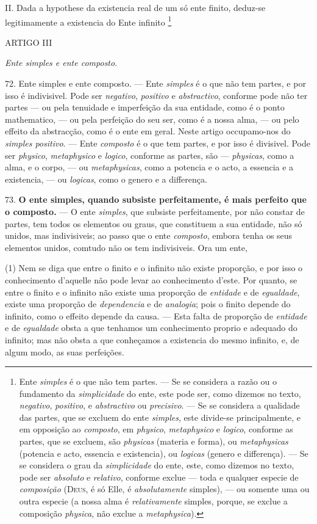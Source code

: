  II. Dada a hypothese da existencia real de um só ente finito, deduz-se legitimamente a existencia do Ente infinito \footnote{Ente \emph{simples} é o que não tem partes. --- Se se considera a razão ou o fundamento da \emph{simplicidade} do ente, este pode ser, como dizemos no texto, \emph{negativo}, \emph{positivo}, e \emph{abstractivo} ou \emph{precisivo}. --- Se se considera a qualidade das partes, que se excluem do ente \emph{simples}, este divide-se principalmente, e em opposição ao \emph{composto}, em \emph{physico}, \emph{metaphysico} e \emph{logico}, conforme as partes, que se excluem, são \emph{physicas} (materia e forma), ou \emph{metaphysicas} (potencia e acto, essencia e existencia), ou \emph{logicas} (genero e differença). --- Se se considera o grau da \emph{simplicidade} do ente, este, como dizemos no texto, pode ser \emph{absoluto} e \emph{relativo}, conforme exclue --- toda e qualquer especie de \emph{composição} (\textsc{Deus}, é só Elle, é \emph{absolutamente} simples), --- ou somente uma ou outra especie (a nossa alma é \emph{relativamente} simples, porque, se exclue a composição \emph{physica}, não exclue a \emph{metaphysica}).}

ARTIGO III

\emph{Ente simples e ente composto}.

72. Ente simples e ente composto. --- Ente \emph{simples} é o que não tem partes, e por isso é indivisivel. Pode ser \emph{negativo}, \emph{positivo} e \emph{abstractivo}, conforme pode não ter partes --- ou pela tenuidade e imperfeição da sua entidade, como é o ponto mathematico, --- ou pela perfeição do seu ser, como é a nossa alma, --- ou pelo effeito da abstracção, como é o ente em geral. Neste artigo occupamo-nos do \emph{simples positivo}. --- Ente \emph{composto} é o que tem partes, e por isso é divisivel. Pode ser \emph{physico}, \emph{metaphysico} e \emph{logico}, conforme as partes, são --- \emph{physicas}, como a alma, e o corpo, --- ou \emph{metaphysicas}, como a potencia e o acto, a essencia e a existencia, --- ou \emph{logicas}, como o genero e a differença.

73. \textbf{O ente simples, quando subsiste perfeitamente, é mais perfeito que o composto.} --- O ente \emph{simples}, que subsiste perfeitamente, por não constar de partes, tem todos os elementos ou graus, que constituem a sua entidade, não só unidos, mas indivisiveis; ao passo que o ente \emph{composto}, embora tenha os seus elementos unidos, comtudo não os tem indivisiveis. Ora um ente,

(1) Nem se diga que entre o finito e o infinito não existe proporção, e por isso o conhecimento d'aquelle não pode levar ao conhecimento d'este. Por quanto, se entre o finito e o infinito não existe uma proporção de \emph{entidade} e de \emph{egualdade}, existe uma proporção de \emph{dependencia} e de \emph{analogia}; pois o finito depende do infinito, como o effeito depende da causa. --- Esta falta de proporção de \emph{entidade} e de \emph{egualdade} obsta a que tenhamos um conhecimento proprio e adequado do infinito; mas não obsta a que conheçamos a existencia do mesmo infinito, e, de algum modo, as suas perfeições.

